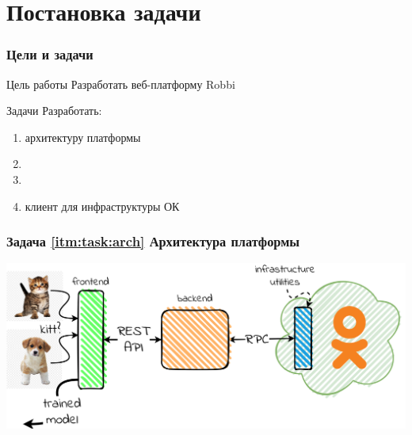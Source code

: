 \section{Постановка задачи}

\begin{frame}
\frametitle{Цели и задачи}
\begin{block}{Цель работы}
	Разработать веб-платформу Robbi
\end{block}

\bigskip
\pause

\begin{block}{Задачи}
	Разработать:
	\begin{enumerate}
		\item \label{itm:task:arch} архитектуру платформы
		\item {}
		\item {}
		\item \label{itm:task:infra} клиент для инфраструктуры ОК
	\end{enumerate}
\end{block}
\end{frame}

\begin{frame}
\frametitle{Задача \ref{itm:task:arch} Архитектура платформы}
\includegraphics[width=\textwidth]{architecture.png}
\end{frame}
